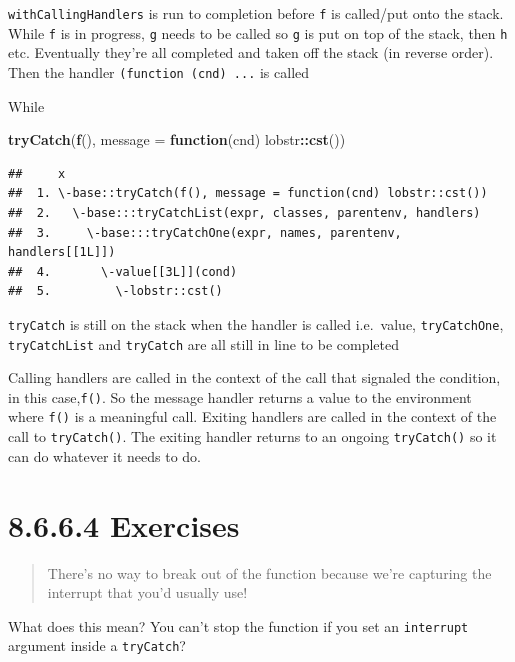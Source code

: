 \documentclass[]{book}
\newenvironment{Shaded}{\begin{snugshade}}{\end{snugshade}}
\newcommand{\ControlFlowTok}[1]{\textcolor[rgb]{0.13,0.29,0.53}{\textbf{#1}}}
\newcommand{\DataTypeTok}[1]{\textcolor[rgb]{0.13,0.29,0.53}{#1}}
\newcommand{\KeywordTok}[1]{\textcolor[rgb]{0.13,0.29,0.53}{\textbf{#1}}}
\newcommand{\NormalTok}[1]{#1}
\newcommand{\OperatorTok}[1]{\textcolor[rgb]{0.81,0.36,0.00}{\textbf{#1}}}
\begin{document}
\texttt{withCallingHandlers} is run to completion before \texttt{f} is called/put onto the stack. While \texttt{f} is in progress, \texttt{g} needs to be called so \texttt{g} is put on top of the stack, then \texttt{h} etc. Eventually they're all completed and taken off the stack (in reverse order). Then the handler \texttt{(function\ (cnd)\ ...} is called

While

\begin{Shaded}
\begin{Highlighting}[]
\KeywordTok{tryCatch}\NormalTok{(}\KeywordTok{f}\NormalTok{(), }\DataTypeTok{message =} \ControlFlowTok{function}\NormalTok{(cnd) lobstr}\OperatorTok{::}\KeywordTok{cst}\NormalTok{())}
\end{Highlighting}
\end{Shaded}

\begin{verbatim}
##     x
##  1. \-base::tryCatch(f(), message = function(cnd) lobstr::cst())
##  2.   \-base:::tryCatchList(expr, classes, parentenv, handlers)
##  3.     \-base:::tryCatchOne(expr, names, parentenv, handlers[[1L]])
##  4.       \-value[[3L]](cond)
##  5.         \-lobstr::cst()
\end{verbatim}

\texttt{tryCatch} is still on the stack when the handler is called i.e.~value, \texttt{tryCatchOne}, \texttt{tryCatchList} and \texttt{tryCatch} are all still in line to be completed

Calling handlers are called in the context of the call that signaled the condition, in this case,\texttt{f()}. So the message handler returns a value to the environment where \texttt{f()} is a meaningful call. Exiting handlers are called in the context of the call to \texttt{tryCatch()}. The exiting handler returns to an ongoing \texttt{tryCatch()} so it can do whatever it needs to do.

\hypertarget{exercises-7}{%
\section*{8.6.6.4 Exercises}\label{exercises-7}}

\begin{quote}
There's no way to break out of the function because we're capturing the interrupt that you'd usually use!
\end{quote}

What does this mean? You can't stop the function if you set an \texttt{interrupt} argument inside a \texttt{tryCatch}?
\end{document}
